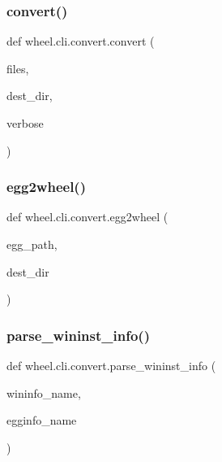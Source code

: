 \subsubsection{\texorpdfstring{convert()}{convert()}}
{\footnotesize\ttfamily def wheel.\+cli.\+convert.\+convert (\begin{DoxyParamCaption}\item[{}]{files,  }\item[{}]{dest\+\_\+dir,  }\item[{}]{verbose }\end{DoxyParamCaption})}

\mbox{\label{namespacewheel_1_1cli_1_1convert_a83b8a22a02b8e4ffdf7ee67cfb897d6b}} 
\subsubsection{\texorpdfstring{egg2wheel()}{egg2wheel()}}
{\footnotesize\ttfamily def wheel.\+cli.\+convert.\+egg2wheel (\begin{DoxyParamCaption}\item[{}]{egg\+\_\+path,  }\item[{}]{dest\+\_\+dir }\end{DoxyParamCaption})}

\mbox{\label{namespacewheel_1_1cli_1_1convert_af3abb35083c36470841fbac93fc8f19f}} 
\subsubsection{\texorpdfstring{parse\+\_\+wininst\+\_\+info()}{parse\_wininst\_info()}}
{\footnotesize\ttfamily def wheel.\+cli.\+convert.\+parse\+\_\+wininst\+\_\+info (\begin{DoxyParamCaption}\item[{}]{wininfo\+\_\+name,  }\item[{}]{egginfo\+\_\+name }\end{DoxyParamCaption})}

